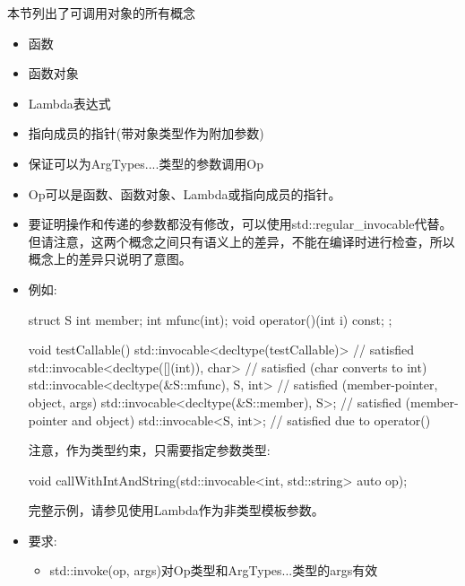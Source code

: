 
本节列出了可调用对象的所有概念

\begin{itemize}
\item
函数

\item
函数对象

\item
Lambda表达式

\item
指向成员的指针(带对象类型作为附加参数)
\end{itemize}



\begin{itemize}
\item
保证可以为ArgTypes....类型的参数调用Op

\item
Op可以是函数、函数对象、Lambda或指向成员的指针。

\item
要证明操作和传递的参数都没有修改，可以使用std::regular\_invocable代替。但请注意，这两个概念之间只有语义上的差异，不能在编译时进行检查，所以概念上的差异只说明了意图。

\item
例如:

\begin{cpp}
struct S {
	int member;
	int mfunc(int);
	void operator()(int i) const;
};

void testCallable()
{
	std::invocable<decltype(testCallable)> // satisfied
	std::invocable<decltype([](int){}), char> // satisfied (char converts to int)
	std::invocable<decltype(&S::mfunc), S, int> // satisfied (member-pointer, object, args)
	std::invocable<decltype(&S::member), S>; // satisfied (member-pointer and object)
	std::invocable<S, int>; // satisfied due to operator()
}
\end{cpp}

注意，作为类型约束，只需要指定参数类型:

\begin{cpp}
void callWithIntAndString(std::invocable<int, std::string> auto op);
\end{cpp}

完整示例，请参见使用Lambda作为非类型模板参数。

\item
要求:
\begin{itemize}
\item
std::invoke(op, args)对Op类型和ArgTypes...类型的args有效
\end{itemize}
\end{itemize}

